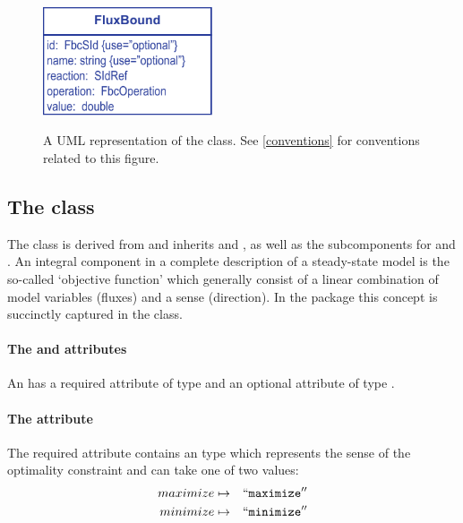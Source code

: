 \begin{figure}[h]
  \centering
  \includegraphics[width=5cm]{images/fbc_uml_fbnd.pdf}\\
  \caption{A UML representation of the \FBCPackage \FluxBound class. See
  \ref{conventions} for conventions related to this figure.}
  \label{fig:fbc_uml_fbnd}
\end{figure}


\subsection{The \FBC {} class}
\label{objective-class}
\label{listoffluxobjectives-class}

The \FBC \Objective class is derived from \SBML \SBase and inherits
 and , as well as the subcomponents for
\Annotation and \Notes. An integral component in a complete description 
of a steady-state model is the so-called `objective function' which generally
consist of a linear combination of model variables (fluxes) and a sense
(direction). In the \FBC package this concept is succinctly captured in the
\Objective class.

\paragraph{The  and  attributes}
An \Objective has a required attribute  of type
 and an optional attribute  of type .

\paragraph{The  attribute}
The required  attribute contains an  type
which represents the sense of the optimality constraint and can take one of
two values:
\begin{eqnarray*}
\label{obj-type-enum}
 \nonumber
  maximize & \mapsto & ``\textcolor{black}{\textup{\ttfamily{maximize}}}''\\
  minimize & \mapsto & ``\textcolor{black}{\textup{\ttfamily{minimize}}}''
\end{eqnarray*}

